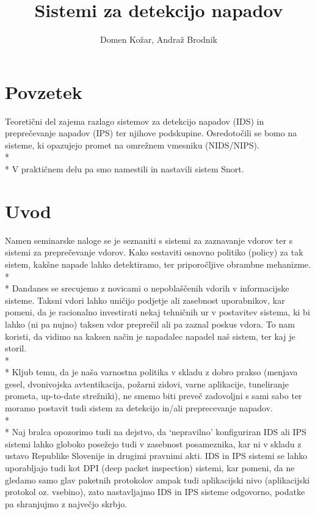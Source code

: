 \documentclass[12pt]{article}
\title{Sistemi za detekcijo napadov}
\author{Domen Kožar, Andraž Brodnik}
\let\stdsection\section
\renewcommand\section{\newpage\stdsection}
\begin{document}
\maketitle

\tableofcontents

\section{Povzetek}
Teoretični del zajema razlago sistemov za detekcijo napadov (IDS) in preprečevanje napadov (IPS) 
ter njihove podskupine. 
Osredotočili se bomo na sisteme, ki opazujejo promet na omrežnem vmesniku (NIDS/NIPS).
\\*
\\*
V praktičnem delu pa smo namestili in nastavili sistem Snort.

\section{Uvod}

Namen seminarske naloge se je seznaniti s sistemi za zaznavanje vdorov ter s sistemi za preprečevanje vdorov. 
Kako sestaviti osnovno politiko (policy) za tak sistem, kakšne napade lahko detektiramo, ter priporočljive obrambne mehanizme.
\\*
\\*
Dandanes se srecujemo z novicami o nepoblaščenih vdorih v informacijske sisteme. Taksni vdori lahko uničijo podjetje ali zasebnost uporabnikov,
kar pomeni, da je racionalno investirati nekaj tehničnih ur v postavitev sistema, ki bi lahko (ni pa nujno) taksen vdor preprečil ali pa zaznal poskus vdora.
To nam koristi, da vidimo na kaksen način je napadalec napadel naš sistem, ter kaj je storil. 
\\*
\\*
Kljub temu, da je naša varnostna politika v skladu z dobro prakso (menjava gesel, dvonivojska avtentikacija, požarni zidovi,
varne aplikacije, tuneliranje prometa, up-to-date strežniki), ne smemo biti preveč zadovoljni s sami sabo ter moramo postavit tudi sistem za detekcijo in/ali preprecevanje napadov.
\\*
\\*
Naj bralca opozorimo tudi na dejstvo, da `nepravilno' konfiguriran IDS ali IPS sistemi lahko globoko posežejo
tudi v zasebnost posameznika, kar ni v skladu z ustavo Republike Slovenije in drugimi pravnimi akti.
IDS in IPS sistemi se lahko uporabljajo tudi kot DPI (deep packet inspection) sistemi, kar pomeni, da ne gledamo
samo glav paketnih protokolov ampak tudi aplikacijski nivo (aplikacijski protokol oz. vsebino), 
zato nastavljajmo IDS in IPS sisteme odgovorno, podatke pa shranjujmo z največjo skrbjo.
\end{document}

